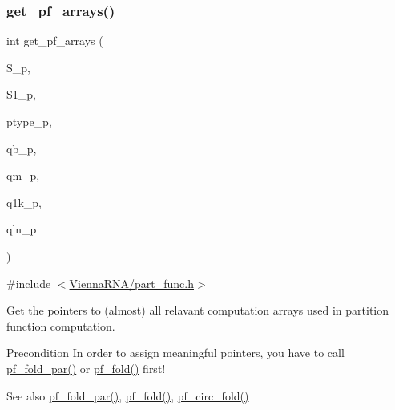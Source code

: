 \subsubsection{\texorpdfstring{get\+\_\+pf\+\_\+arrays()}{get\_pf\_arrays()}}
{\footnotesize\ttfamily int get\+\_\+pf\+\_\+arrays (\begin{DoxyParamCaption}\item[{short $\ast$$\ast$}]{S\+\_\+p,  }\item[{short $\ast$$\ast$}]{S1\+\_\+p,  }\item[{char $\ast$$\ast$}]{ptype\+\_\+p,  }\item[{\hyperlink{group__data__structures_ga31125aeace516926bf7f251f759b6126}{F\+L\+T\+\_\+\+O\+R\+\_\+\+D\+BL} $\ast$$\ast$}]{qb\+\_\+p,  }\item[{\hyperlink{group__data__structures_ga31125aeace516926bf7f251f759b6126}{F\+L\+T\+\_\+\+O\+R\+\_\+\+D\+BL} $\ast$$\ast$}]{qm\+\_\+p,  }\item[{\hyperlink{group__data__structures_ga31125aeace516926bf7f251f759b6126}{F\+L\+T\+\_\+\+O\+R\+\_\+\+D\+BL} $\ast$$\ast$}]{q1k\+\_\+p,  }\item[{\hyperlink{group__data__structures_ga31125aeace516926bf7f251f759b6126}{F\+L\+T\+\_\+\+O\+R\+\_\+\+D\+BL} $\ast$$\ast$}]{qln\+\_\+p }\end{DoxyParamCaption})}



{\ttfamily \#include $<$\hyperlink{part__func_8h}{Vienna\+R\+N\+A/part\+\_\+func.\+h}$>$}



Get the pointers to (almost) all relavant computation arrays used in partition function computation. 

\begin{DoxyPrecond}{Precondition}
In order to assign meaningful pointers, you have to call \hyperlink{group__pf__fold_gac4f95bee734b2563a3d6e9932117ebdf}{pf\+\_\+fold\+\_\+par()} or \hyperlink{group__pf__fold_gadc3db3d98742427e7001a7fd36ef28c2}{pf\+\_\+fold()} first! 
\end{DoxyPrecond}
\begin{DoxySeeAlso}{See also}
\hyperlink{group__pf__fold_gac4f95bee734b2563a3d6e9932117ebdf}{pf\+\_\+fold\+\_\+par()}, \hyperlink{group__pf__fold_gadc3db3d98742427e7001a7fd36ef28c2}{pf\+\_\+fold()}, \hyperlink{group__pf__fold_ga819ce5fca8984004ac81c4a3b04cb735}{pf\+\_\+circ\+\_\+fold()} 
\end{DoxySeeAlso}

